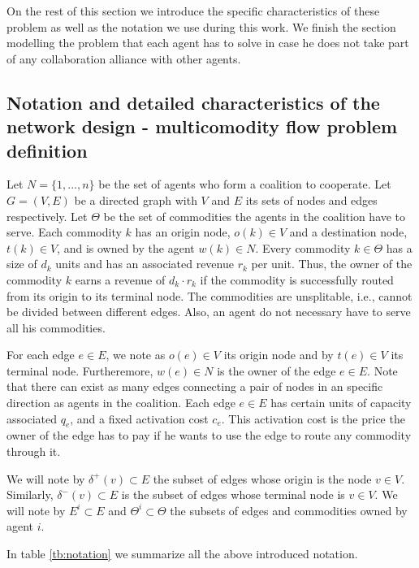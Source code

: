\documentclass{article}
\begin{document}
On the rest of this section we introduce the specific characteristics of these problem as well as the notation we use during this work. We finish the section modelling the problem that each agent has to solve in case he does not take part of any collaboration alliance with other agents.

\subsection{Notation and detailed characteristics of the network design - multicomodity flow problem definition}
Let $N=\{1,...,n\}$ be the set of agents who form a coalition to cooperate. Let $G=(V,E)$ be a directed graph with
$V$ and $E$ its sets of nodes and edges respectively. 
Let $\Theta$ be the set of commodities the agents in the coalition have to serve. Each commodity $k$ has an origin node, $o(k)\in V$ and a destination node, $t(k)\in V$, and is owned by the agent $w(k)\in N$. Every commodity $k\in\Theta$ has a size of $d_k$ units and has an associated revenue $r_k$ per unit. Thus, the owner of the commodity $k$ earns a revenue of $d_k\cdot r_k$ if the commodity is successfully routed from its origin to its terminal node. The commodities are unsplitable, i.e., cannot be divided between different edges. Also, an agent do not necessary have to serve all his commodities.

For each edge $e \in E$, we note as $o(e)\in V$ its origin node and by $t(e)\in V$ its terminal node. Furtheremore, $w(e)\in N$ is the owner of the edge $e\in E$. Note that there can exist as many edges connecting a pair of nodes in an specific direction as agents in the coalition. Each edge $e \in E$ has certain units of capacity associated $q_e$, and a fixed activation
cost $c_e$. This activation cost is the price the owner of the edge has to pay if he wants to use the edge to route any commodity through it.

We will note by $\delta^+(v)\subset E$ the subset of edges whose origin is the node $v\in V$. Similarly, $\delta^-(v)\subset E$ is the subset of edges whose terminal node is $v\in V$. We will note by $E^i \subset E$ and $\Theta^i\subset \Theta$ the subsets of edges and commodities owned by agent $i$.

In table \ref{tb:notation} we summarize all the above introduced notation.
\end{document}
